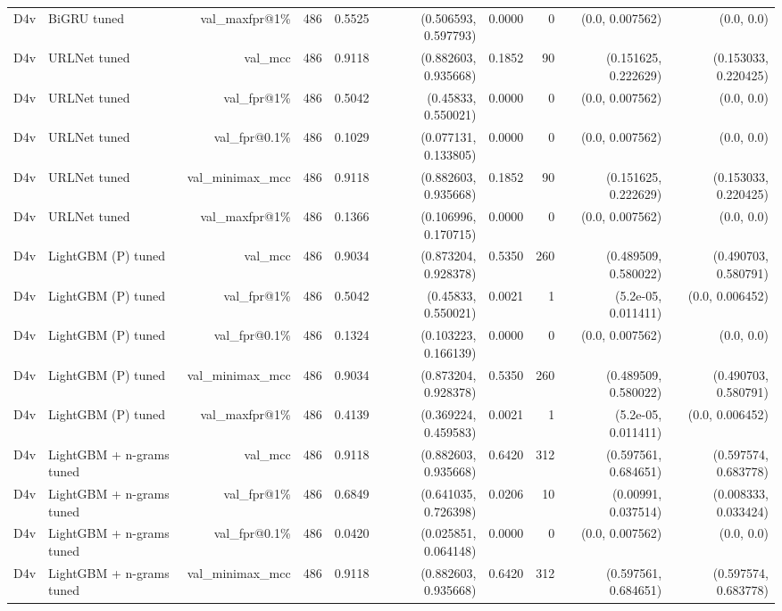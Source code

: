 \begin{table}[t]
\begin{tabular}{llrrrrrrrr}
D4v & BiGRU tuned & val\_maxfpr@1\% & 486 & 0.5525 & (0.506593, 0.597793) & 0.0000 & 0 & (0.0, 0.007562) & (0.0, 0.0) \\
D4v & URLNet tuned & val\_mcc & 486 & 0.9118 & (0.882603, 0.935668) & 0.1852 & 90 & (0.151625, 0.222629) & (0.153033, 0.220425) \\
D4v & URLNet tuned & val\_fpr@1\% & 486 & 0.5042 & (0.45833, 0.550021) & 0.0000 & 0 & (0.0, 0.007562) & (0.0, 0.0) \\
D4v & URLNet tuned & val\_fpr@0.1\% & 486 & 0.1029 & (0.077131, 0.133805) & 0.0000 & 0 & (0.0, 0.007562) & (0.0, 0.0) \\
D4v & URLNet tuned & val\_minimax\_mcc & 486 & 0.9118 & (0.882603, 0.935668) & 0.1852 & 90 & (0.151625, 0.222629) & (0.153033, 0.220425) \\
D4v & URLNet tuned & val\_maxfpr@1\% & 486 & 0.1366 & (0.106996, 0.170715) & 0.0000 & 0 & (0.0, 0.007562) & (0.0, 0.0) \\
D4v & LightGBM (P) tuned & val\_mcc & 486 & 0.9034 & (0.873204, 0.928378) & 0.5350 & 260 & (0.489509, 0.580022) & (0.490703, 0.580791) \\
D4v & LightGBM (P) tuned & val\_fpr@1\% & 486 & 0.5042 & (0.45833, 0.550021) & 0.0021 & 1 & (5.2e-05, 0.011411) & (0.0, 0.006452) \\
D4v & LightGBM (P) tuned & val\_fpr@0.1\% & 486 & 0.1324 & (0.103223, 0.166139) & 0.0000 & 0 & (0.0, 0.007562) & (0.0, 0.0) \\
D4v & LightGBM (P) tuned & val\_minimax\_mcc & 486 & 0.9034 & (0.873204, 0.928378) & 0.5350 & 260 & (0.489509, 0.580022) & (0.490703, 0.580791) \\
D4v & LightGBM (P) tuned & val\_maxfpr@1\% & 486 & 0.4139 & (0.369224, 0.459583) & 0.0021 & 1 & (5.2e-05, 0.011411) & (0.0, 0.006452) \\
D4v & LightGBM + n-grams tuned & val\_mcc & 486 & 0.9118 & (0.882603, 0.935668) & 0.6420 & 312 & (0.597561, 0.684651) & (0.597574, 0.683778) \\
D4v & LightGBM + n-grams tuned & val\_fpr@1\% & 486 & 0.6849 & (0.641035, 0.726398) & 0.0206 & 10 & (0.00991, 0.037514) & (0.008333, 0.033424) \\
D4v & LightGBM + n-grams tuned & val\_fpr@0.1\% & 486 & 0.0420 & (0.025851, 0.064148) & 0.0000 & 0 & (0.0, 0.007562) & (0.0, 0.0) \\
D4v & LightGBM + n-grams tuned & val\_minimax\_mcc & 486 & 0.9118 & (0.882603, 0.935668) & 0.6420 & 312 & (0.597561, 0.684651) & (0.597574, 0.683778) \\

\end{tabular}
\end{table}
